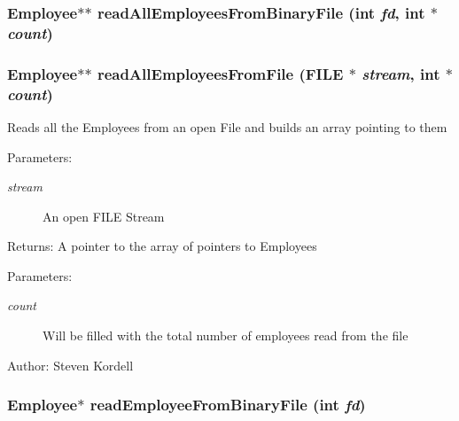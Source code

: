 \subsubsection{\setlength{\rightskip}{0pt plus 5cm}\bf{Employee}$\ast$$\ast$ read\-All\-Employees\-From\-Binary\-File (int {\em fd}, int $\ast$ {\em count})}\label{employeef_8h_446e8ed3f3661f1856fca912048832b4}


\subsubsection{\setlength{\rightskip}{0pt plus 5cm}\bf{Employee}$\ast$$\ast$ read\-All\-Employees\-From\-File (FILE $\ast$ {\em stream}, int $\ast$ {\em count})}\label{employeef_8h_06cf2848ec681a5759cdc372d1dbc46c}


Reads all the Employees from an open File and builds an array pointing to them \begin{Desc}
\item[Parameters:]
\begin{description}
\item[{\em stream}]An open FILE Stream \end{description}
\end{Desc}
\begin{Desc}
\item[Returns:]A pointer to the array of pointers to Employees \end{Desc}
\begin{Desc}
\item[Parameters:]
\begin{description}
\item[{\em count}]Will be filled with the total number of employees read from the file \end{description}
\end{Desc}
\begin{Desc}
\item[Author:]Steven Kordell \end{Desc}
\subsubsection{\setlength{\rightskip}{0pt plus 5cm}\bf{Employee}$\ast$ read\-Employee\-From\-Binary\-File (int {\em fd})}\label{employeef_8h_9b60b71d275839e4b93dd6a1827b9e31}


